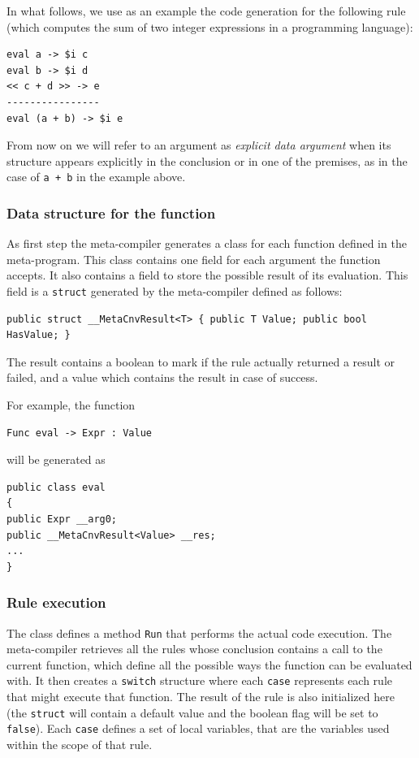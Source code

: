 \noindent
In what follows, we use as an example the code generation for the following rule (which computes the sum of two integer expressions in a programming language):

\begin{lstlisting}
eval a -> $i c
eval b -> $i d
<< c + d >> -> e
----------------
eval (a + b) -> $i e
\end{lstlisting}

From now on we will refer to an argument as \textit{explicit data argument} when its structure appears explicitly in the conclusion or in one of the premises, as in the case of \texttt{a + b} in the example above.

\subsubsection{Data structure for the function}
\label{subsubsec:function_generation}

As first step the meta-compiler generates a class for each function defined in the meta-program. This class contains one field for each argument the function accepts. It also contains a field to store the possible result of its evaluation. This field is a \texttt{struct} generated by the meta-compiler defined as follows:

\begin{lstlisting}
public struct __MetaCnvResult<T> { public T Value; public bool HasValue; }
\end{lstlisting}

The result contains a boolean to mark if the rule actually returned a result or failed, and a value which contains the result in case of success.

For example, the function

\begin{lstlisting}
Func eval -> Expr : Value
\end{lstlisting}

\noindent
will be generated as

\begin{lstlisting}
public class eval
{
public Expr __arg0;
public __MetaCnvResult<Value> __res;
...
}
\end{lstlisting}

\subsubsection{Rule execution}

The class defines a method \texttt{Run} that performs the actual code execution. The meta-compiler retrieves all the rules whose conclusion contains a call to the current function, which define all the possible ways the function can be evaluated with. It then creates a \texttt{switch} structure where each \texttt{case} represents each rule that might execute that function. The result of the rule is also initialized here (the \texttt{struct} will contain a default value and the boolean flag will be set to \texttt{false}). Each \texttt{case} defines a set of local variables, that are the variables used within the scope of that rule.

